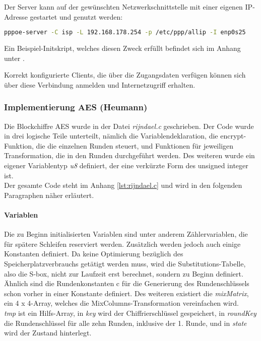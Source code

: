 	Der Server kann auf der gewünschten Netzwerkschnittstelle mit einer eigenen IP-Adresse
	gestartet und genutzt werden:
	\begin{lstlisting}[language=bash]
		pppoe-server -C isp -L 192.168.178.254 -p /etc/ppp/allip -I enp0s25
	\end{lstlisting}

    Ein Beispiel-Initskript, welches diesen Zweck erfüllt befindet sich im Anhang unter .

        Korrekt konfigurierte Clients, die über die Zugangsdaten verfügen können sich über
        diese Verbindung anmelden und Internetzugriff erhalten.

	\subsubsection{Implementierung AES (Heumann)}
	\label{implementierung-aes}
	Die Blockchiffre AES wurde in der Datei \emph{rijndael.c} geschrieben. Der Code wurde in drei
	logische Teile unterteilt, nämlich die Variablendeklaration, die encrypt-Funktion, die die
	einzelnen Runden steuert, und Funktionen für jeweiligen Transformation, die in den Runden
	durchgeführt werden. Des weiteren wurde ein eigener Variablentyp \emph{u8} definiert,
	der eine verkürzte Form des unsigned integer ist. \\
	Der gesamte Code steht im Anhang \ref{lst:rijndael.c} und wird in den folgenden Paragraphen näher erläutert.

		\paragraph{Variablen}
		Die zu Beginn initialisierten Variablen sind unter anderem Zählervariablen, die für spätere Schleifen
		reserviert werden. Zusätzlich werden jedoch auch einige Konstanten definiert. Da keine
		Optimierung bezüglich des Speicherplatzverbrauchs getätigt werden muss, wird die Substitutions-Tabelle,
		also die S-box, nicht zur Laufzeit erst berechnet, sondern zu Beginn definiert. Ähnlich
		sind die Rundenkonstanten c für die Generierung des Rundenschlüssels schon vorher in einer Konstante
		definiert. Des weiteren existiert die \emph{mixMatrix}, ein 4 x 4-Array, welches die
		MixColumns-Transformation vereinfachen wird. \\
		\emph{tmp} ist ein Hilfs-Array, in \emph{key} wird der Chiffrierschlüssel gespeichert, in \emph{roundKey}
		die Rundenschlüssel für alle zehn Runden, inklusive der 1. Runde, und in \emph{state} wird der Zustand
		hinterlegt. 
 
